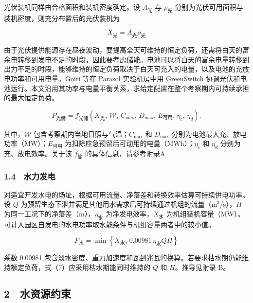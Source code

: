 光伏装机同样由合格面积和装机密度确定。设 $A_{\text{光}}$ 与 $\rho_{\text{光}}$ 分别为光伏可用面积与装机密度，则充分布置后的光伏装机为

\begin{equation}
X_{\text{光}}=A_{\text{光}}\rho_{\text{光}}
\tag{5}
\end{equation}

由于光伏提供能源存在昼夜波动，要提高全天可维持的恒定负荷，还需将白天的富余电转移到发电不足的时段，因此要考虑储能。电池可以将白天的富余电量转移到出力不足的时段，能够维持的恒定负荷取决于白天可充入的电量，以及电池的充放电功率和可用电量。Goiri 等在 Parasol 实验机房中用 GreenSwitch 协调光伏和电池运行\cite{q1ref04}。本文沿用其功率与电量平衡关系，求给定配置在整个考察期内可持续承担的最大恒定负荷。

\begin{equation}
P_{\text{光储}}=
f_{\text{光储}}\!\left(X_{\text{光}},\,\mathcal W,\,
C_{\max},\,D_{\max},\,E_{\text{可用}},\,\eta_c,\,\eta_d\right).
\tag{6}
\end{equation}

其中，$\mathcal W$ 包含考察期内当地日照与气温；$C_{\max}$ 和 $D_{\max}$ 分别为电池最大充、放电功率（MW）；$E_{\text{可用}}$ 为扣除应急预留后可动用的电量（MWh）；$\eta_c$ 和 $\eta_d$ 分别为充、放电效率。关于该 $f_{\text{储}}$ 的具体信息，请参考附录A

\subsubsection{1.4　水力发电}

对适宜开发水电的场址，根据可用流量、净落差和转换效率估算可持续供电功率\cite{q1ref06}。设 $Q$ 为预留生态下泄并满足其他用水需求后可持续通过机组的流量（m$^3$/s），$H$ 为同一工况下的净落差（m），$\eta_{\text{水}}$ 为净发电效率，$X_{\text{水}}$ 为机组装机容量（MW）。可计入园区自发电的水电功率取水能条件与机组容量两者中的较小值。

\begin{equation}
P_{\text{水}}=\min\!\left\{X_{\text{水}},\,0.00981\,\eta_{\text{水}}QH\right\}
\tag{7}
\end{equation}

系数 0.00981 包含淡水密度、重力加速度和瓦到兆瓦的换算。若要求枯水期仍能维持额定负荷，式（7）应采用枯水期能同时维持的 $Q$ 和 $H$。推导见附录 B。

\subsection{2　水资源约束}

